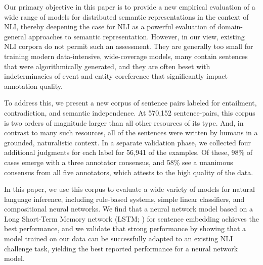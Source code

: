 Our primary objective in this paper is to provide a new empirical
evaluation of a wide range of models for distributed semantic
representations in the context of NLI, thereby deepening the case for
NLI as a powerful evaluation of domain-general approaches to semantic
representation. However, in our view, existing NLI corpora do not
permit such an assessment. They are generally too small for training
modern data-intensive, wide-coverage models, many contain sentences
that were algorithmically generated, and they are often beset with
indeterminacies of event and entity coreference that significantly
impact annotation quality.

To address this, we present a new corpus of sentence pairs labeled for
entailment, contradiction, and semantic independence. At 570,152
sentence-pairs, this corpus is two orders of magnitude larger than all
other resources of its type. And, in contrast to many such resources,
all of the sentences were written by humans in a grounded,
naturalistic context. In a separate validation phase, we collected
four additional judgments for each label for 56,941 of the examples.
Of these, 98\% of cases emerge with a three annotator consensus, 
and 58\% see a unanimous consensus from all five annotators, 
which attests to the high quality of the data.

In this paper, we use this corpus to evaluate a wide variety of models
for natural language inference, including rule-based systems, simple
linear classifiers, and compositional neural networks. We find that
a neural network model based on a Long Short-Term Memory network (LSTM; 
\citealt{hochreiter1997long}) for sentence embedding achieves the best
performance, and we validate that strong performance by showing that
a model trained on our data can be successfully adapted to an existing
NLI challenge task, yielding the best reported performance for a neural network model.






